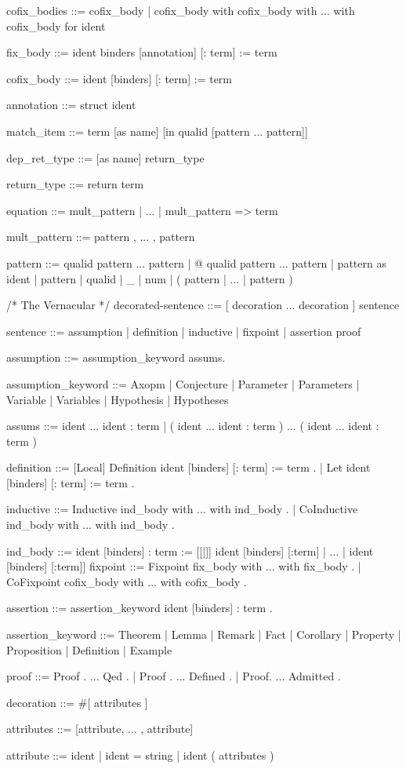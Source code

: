 \documentclass[a4paper,11pt]{article}
\begin{document}
\begin{grm}
cofix_bodies  ::=  cofix_body
				 | cofix_body with cofix_body with ... with cofix_body for ident

fix_body  ::=  ident binders [annotation] [: term] := term

cofix_body  ::=  ident [binders] [: term] := term

annotation  ::=  { struct ident }

match_item  ::=  term [as name] [in qualid [pattern ... pattern]]

dep_ret_type  ::=  [as name] return_type

return_type  ::=  return term

equation  ::=  mult_pattern | ... | mult_pattern => term

mult_pattern  ::=  pattern , ... , pattern

pattern  ::=  qualid pattern ... pattern
			| @ qualid pattern ... pattern
			| pattern as ident
			| pattern %
			| qualid
			| _ 
			| num
			| ( pattern | ... | pattern )

/* The Vernacular */
decorated-sentence  ::=  [ decoration ... decoration ] sentence

sentence  ::=  assumption 
			|  definition
			| inductive
			| fixpoint
			| assertion proof
			
assumption  ::=  assumption_keyword assums.

assumption_keyword  ::=  Axopm 
					  | Conjecture	
					  | Parameter	
					  | Parameters
					  | Variable
					  | Variables
					  | Hypothesis
					  | Hypotheses
					  	
assums  ::=  ident ... ident : term
		   | ( ident ... ident : term ) ... ( ident ... ident : term )					
		   
definition  ::=  [Local] Definition ident [binders] [: term] := term .		   
		       | Let ident [binders] [: term] := term .

inductive  ::=  Inductive ind_body with ... with ind_body .
			  | CoInductive ind_body with ... with ind_body .
			  
ind_body  ::=  ident [binders] : term := 
				[[|]] ident [binders] [:term] | ... | ident [binders] [:term]]			  
fixpoint  ::=  Fixpoint fix_body with ... with fix_body .
			 | CoFixpoint cofix_body with ... with cofix_body .

assertion  ::=  assertion_keyword ident [binders] : term .

assertion_keyword  ::=  Theorem | Lemma
					  | Remark | Fact
					  | Corollary | Property | Proposition
					  | Definition | Example

proof  ::=  Proof . ... Qed .
		  | Proof . ... Defined .
		  | Proof. ... Admitted .

decoration  ::=  #[ attributes ]

attributes  ::=  [attribute, ... , attribute]

attribute  ::=  ident
			  | ident = string
			  | ident ( attributes )

\end{grm}


{}

\end{document}
